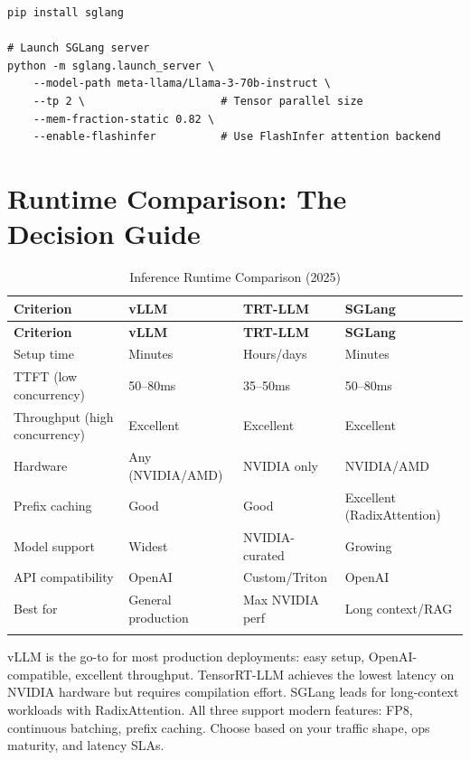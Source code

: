 \documentclass[11pt, twoside, openright]{book}
\newenvironment{chapsummary}
  {\begin{tcolorbox}[enhanced, breakable,
    colback={rgb,255:red,245;green,245;blue,225},
    colframe=AccentOrange, boxrule=1.5pt, arc=4pt,
    title={\bfseries Chapter Summary},
    fonttitle=\bfseries\color{white},
    attach boxed title to top left={yshift=-2mm, xshift=5mm},
    boxed title style={colback=AccentOrange, arc=2pt}]}
  {\end{tcolorbox}}
\begin{document}
\begin{lstlisting}[style=bashstyle, caption={Starting SGLang server}]
pip install sglang

# Launch SGLang server
python -m sglang.launch_server \
    --model-path meta-llama/Llama-3-70b-instruct \
    --tp 2 \                     # Tensor parallel size
    --mem-fraction-static 0.82 \
    --enable-flashinfer          # Use FlashInfer attention backend
\end{lstlisting}

\section{Runtime Comparison: The Decision Guide}

\begin{longtable}{@{}p{3cm}p{3cm}p{3cm}p{3cm}@{}}
  \toprule
  \textbf{Criterion} & \textbf{vLLM} & \textbf{TRT-LLM} & \textbf{SGLang} \\
  \midrule
  \endfirsthead
  \toprule
  \textbf{Criterion} & \textbf{vLLM} & \textbf{TRT-LLM} & \textbf{SGLang} \\
  \midrule
  \endhead
  Setup time & Minutes & Hours/days & Minutes \\
  TTFT (low concurrency) & 50--80ms & 35--50ms & 50--80ms \\
  Throughput (high concurrency) & Excellent & Excellent & Excellent \\
  Hardware & Any (NVIDIA/AMD) & NVIDIA only & NVIDIA/AMD \\
  Prefix caching & Good & Good & Excellent (RadixAttention) \\
  Model support & Widest & NVIDIA-curated & Growing \\
  API compatibility & OpenAI & Custom/Triton & OpenAI \\
  Best for & General production & Max NVIDIA perf & Long context/RAG \\
  \bottomrule
  \caption{Inference Runtime Comparison (2025)}
\end{longtable}

\begin{chapsummary}
vLLM is the go-to for most production deployments: easy setup, OpenAI-compatible,
excellent throughput.  TensorRT-LLM achieves the lowest latency on NVIDIA hardware
but requires compilation effort.  SGLang leads for long-context workloads with
RadixAttention.  All three support modern features: FP8, continuous batching,
prefix caching.  Choose based on your traffic shape, ops maturity, and latency SLAs.
\end{chapsummary}
\end{document}
